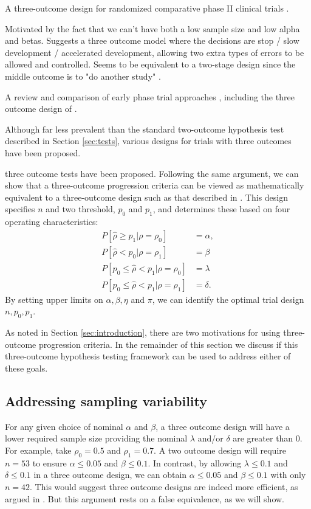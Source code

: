 \documentclass[sagev, Crown]{sagej} %
\begin{document}
A three-outcome design for randomized comparative phase {II} clinical trials \cite{Hong2007}.

Motivated by the fact that we can't have both a low sample size and low alpha and betas. Suggests a three outcome model where the decisions are stop / slow development / accelerated development, allowing two extra types of errors to be allowed and controlled. Seems to be equivalent to a two-stage design since the middle outcome is to "do another study" \cite{Brown2012}.

A review and comparison of early phase trial approaches \cite{Kirby2016}, including the three outcome design of \cite{Brown2012}.

Although far less prevalent than the standard two-outcome hypothesis test described in Section \ref{sec:tests}, various designs for trials with three outcomes have been proposed.

three outcome tests have been proposed. Following the same argument, we can show that a three-outcome progression criteria can be viewed as mathematically equivalent to a three-outcome design such as that described in \cite{Sargent2001}. This design specifies $n$ and two threshold, $p_0$ and $p_1$, and determines these based on four operating characteristics:
\begin{align}
P[ \hat{\rho} \geq p_1 | \rho = \rho_0] & = \alpha, \\
P[ \hat{\rho} < p_0 | \rho = \rho_1] & = \beta \\
P[ p_0 \leq \hat{\rho} < p_1 | \rho = \rho_0] & = \lambda \\
P[ p_0 \leq \hat{\rho} < p_1 | \rho = \rho_1] & = \delta.
\end{align}
By setting upper limits on $\alpha, \beta, \eta$ and $\pi$, we can identify the optimal trial design $n, p_0, p_1$.

As noted in Section \ref{sec:introduction}, there are two motivations for using three-outcome progression criteria. In the remainder of this section we discuss if this three-outcome hypothesis testing framework can be used to address either of these goals.

\subsection{Addressing sampling variability}

For any given choice of nominal $\alpha$ and $\beta$, a three outcome design will have a lower required sample size providing the nominal $\lambda$ and/or $\delta$ are greater than 0. For example, take $\rho_0 = 0.5$ and $\rho_1 = 0.7$. A two outcome design will require $n = 53$ to ensure $\alpha \leq 0.05$ and $\beta \leq 0.1$. In contrast, by allowing $\lambda \leq 0.1$ and $\delta \leq 0.1$ in a three outcome design, we can obtain $\alpha \leq 0.05$ and $\beta \leq 0.1$ with only $n = 42$. This would suggest three outcome designs are indeed more efficient, as argued in \cite{Hong2007}. But this argument rests on a false equivalence, as we will show.
\end{document}
